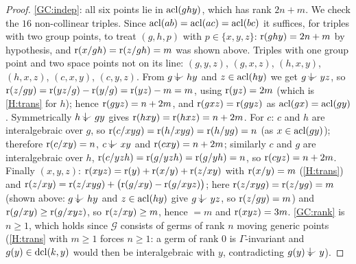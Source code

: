 \begin{proof}
\ref{GC:indep}: all six points lie in $\operatorname{acl}(ghy)$, which has rank $2n+m$.  We check the
$16$ non-collinear triples.  Since $\operatorname{acl}(ab)=\operatorname{acl}(ac)=\operatorname{acl}(bc)$ it suffices, for triples
with two group points, to treat $(g,h,p)$ with $p\in\{x,y,z\}$: $\operatorname{r}(ghy)=2n+m$ by
hypothesis, and $\operatorname{r}(x/gh)=\operatorname{r}(z/gh)=m$ was shown above.  Triples with one group point
and two space points not on its line: $(g,y,z)$, $(g,x,z)$, $(h,x,y)$, $(h,x,z)$,
$(c,x,y)$, $(c,y,z)$.  From $g\ind{}hy$ and $z\in\operatorname{acl}(hy)$ we get $g\ind{}yz$, so
$\operatorname{r}(z/gy)=\operatorname{r}(yz/g)-\operatorname{r}(y/g)=\operatorname{r}(yz)-m=m$, using $\operatorname{r}(yz)=2m$ (which is \ref{H:trans}
for $h$); hence $\operatorname{r}(gyz)=n+2m$, and $\operatorname{r}(gxz)=\operatorname{r}(gyz)$ as $\operatorname{acl}(gx)=\operatorname{acl}(gy)$.
Symmetrically $h\ind{}gy$ gives $\operatorname{r}(hxy)=\operatorname{r}(hxz)=n+2m$.  For $c$: $c$ and $h$ are
interalgebraic over $g$, so $\operatorname{r}(c/xyg)=\operatorname{r}(h/xyg)=\operatorname{r}(h/yg)=n$ (as $x\in\operatorname{acl}(gy)$);
therefore $\operatorname{r}(c/xy)=n$, $c\ind{}xy$ and $\operatorname{r}(cxy)=n+2m$; similarly $c$ and $g$ are
interalgebraic over $h$, $\operatorname{r}(c/yzh)=\operatorname{r}(g/yzh)=\operatorname{r}(g/yh)=n$, so $\operatorname{r}(cyz)=n+2m$.
Finally $(x,y,z)$: $\operatorname{r}(xyz)=\operatorname{r}(y)+\operatorname{r}(x/y)+\operatorname{r}(z/xy)$ with $\operatorname{r}(x/y)=m$ (\ref{H:trans})
and $\operatorname{r}(z/xy)=\operatorname{r}(z/xyg)+\bigl(\operatorname{r}(g/xy)-\operatorname{r}(g/xyz)\bigr)$; here $\operatorname{r}(z/xyg)=\operatorname{r}(z/yg)=m$
(shown above: $g\ind{}hy$ and $z\in\operatorname{acl}(hy)$ give $g\ind{}yz$, so $\operatorname{r}(z/gy)=m$) and $\operatorname{r}(g/xy)\ge\operatorname{r}(g/xyz)$, so
$\operatorname{r}(z/xy)\ge m$, hence $=m$ and $\operatorname{r}(xyz)=3m$.  \ref{GC:rank} is $n\ge1$, which holds
since $\mathcal G$ consists of germs of rank $n$ moving generic points
(\ref{H:trans} with $m\ge1$ forces $n\ge1$: a germ of rank $0$ is $\Gamma$-invariant and
$g(y)\in\operatorname{dcl}(k,y)$ would then be interalgebraic with $y$, contradicting $g(y)\ind{}y$).
\end{proof}
